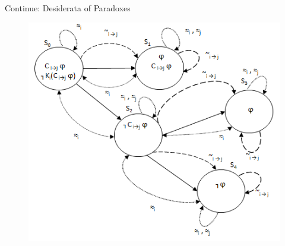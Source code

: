 \documentclass{beamer}
\begin{document}

\begin{frame}{Continue: Desiderata of Paradoxes}

\begin{figure}[htbp]
    \begin{center}
    \includegraphics[width=.75 \columnwidth]{figures/figure2.png}
    \end{center}
    \end{figure}
\end{frame}
\end{document}
